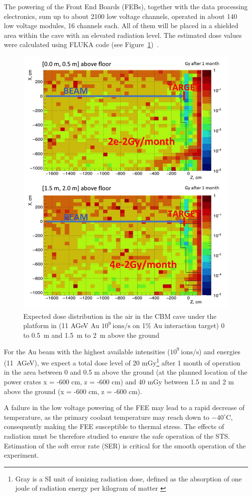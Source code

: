 The powering of the Front End Boards (\gls{FEB}s), together with the data processing electronics, sum up to about 2100 low voltage channels, operated in about 140 low voltage modules, 16 channels each. All of them will be placed in a shielded area within the cave with an elevated radiation level. The estimated dose values were calculated using FLUKA code (see Figure~\ref{fig:mCBM})~\cite{FLUKA}. 

\begin{figure}[!h]
    \centering
    \includegraphics[width=0.55\columnwidth]{Chapter4/images/Dose00.jpg}
    \caption{Expected dose distribution in the air in the \gls{CBM}
cave under the platform in (11 AGeV Au $10^{9} \mathrm{\ ions/s}$ on 1\% Au
interaction target) 0 to 0.5 m and 1.5 m to 2 m above the ground~\cite{fluka_senger}} 
    \label{fig:mCBM}
\end{figure}
For the Au beam with the highest available intensities 
($10^{9}\mathrm{\ ions/s}$) and energies (11~AGeV), we expect a total dose level of 20 mGy\footnote{Gray is a SI unit of ionizing radiation dose, defined as the absorption of one joule of radiation energy per kilogram of matter \cite{gray}} after 1 month of operation in the area between 0 and 0.5 m above the ground (at the planned location of the power crates x = -600 cm, z = -600 cm) and 40 mGy between 1.5 m and 2 m above the ground (x = -600 cm, z = -600 cm).

A failure in the low voltage powering of the FEE may lead to a rapid decrease of temperature, as the primary coolant temperature may reach down to $-40^{\circ}\mathrm{C}$, consequently making the FEE susceptible to thermal stress. The effects of radiation must be therefore studied to ensure the safe operation of the \gls{STS}. Estimation of the soft error rate (\gls{SER}) is critical for the smooth operation of the experiment. 


